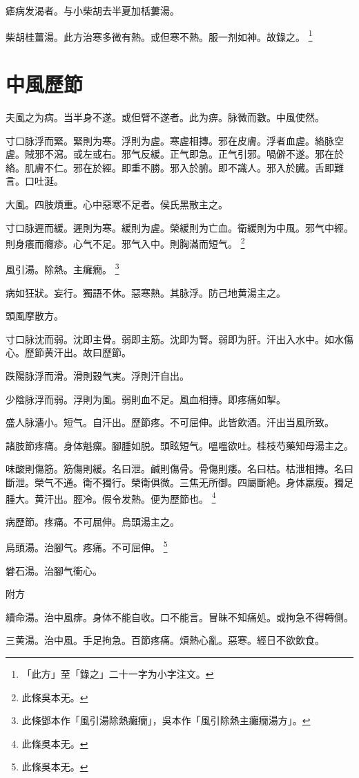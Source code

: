 \documentclass[12pt,twoside,UTF8,b5paper]{ctexbook}
\begin{document}
瘧病发渴者。与小柴胡去半夏加栝蔞湯。

柴胡桂薑湯。此方治寒多微有熱。或但寒不熱。服一剂如神。故錄之。
	\footnote{「此方」至「錄之」二十一字为小字注文。}

\chapter{中風歷節}

夫風之为病。当半身不遂。或但臂不遂者。此为痹。脉微而數。中風使然。

寸口脉浮而緊。緊則为寒。浮則为虗。寒虗相摶。邪在皮膚。浮者血虗。絡脉空虗。賊邪不瀉。或左或右。邪气反緩。正气即急。正气引邪。喎僻不遂。邪在於絡。肌膚不仁。邪在於經。即重不勝。邪入於腑。即不識人。邪入於臓。舌即難言。口吐涎。

大風。四肢煩重。心中惡寒不足者。侯氏黑散主之。

寸口脉遲而緩。遲則为寒。緩則为虗。榮緩則为亡血。衛緩則为中風。邪气中經。則身癢而癮疹。心气不足。邪气入中。則胸滿而短气。
	\footnote{此條吳本无。}

風引湯。除熱。主癱癇。
	\footnote{此條鄧本作「風引湯除熱癱癇」，吳本作「風引除熱主癱癇湯方」。}

病如狂狀。妄行。獨語不休。惡寒熱。其脉浮。防己地黄湯主之。

頭風摩散方。

寸口脉沈而弱。沈即主骨。弱即主筋。沈即为腎。弱即为肝。汗出入水中。如水傷心。歷節黄汗出。故曰歷節。

跌陽脉浮而滑。滑則穀气実。浮則汗自出。

少陰脉浮而弱。浮則为風。弱則血不足。風血相摶。即疼痛如掣。

盛人脉濇小。短气。自汗出。歷節疼。不可屈伸。此皆飲酒。汗出当風所致。

諸肢節疼痛。身体魁瘰。腳腫如脱。頭眩短气。嗢嗢欲吐。桂枝芍藥知母湯主之。

味酸則傷筋。筋傷則緩。名曰泄。鹹則傷骨。骨傷則痿。名曰枯。枯泄相摶。名曰斷泄。榮气不通。衛不獨行。榮衛俱微。三焦无所御。四屬斷絶。身体羸瘦。獨足腫大。黄汗出。脛冷。假令发熱。便为歷節也。
	\footnote{此條吳本无。}

病歷節。疼痛。不可屈伸。烏頭湯主之。

烏頭湯。治腳气。疼痛。不可屈伸。
	\footnote{此條吳本无。}

礬石湯。治腳气衝心。

附方

續命湯。治中風痱。身体不能自收。口不能言。冒昧不知痛処。或拘急不得轉側。

三黄湯。治中風。手足拘急。百節疼痛。煩熱心亂。惡寒。經日不欲飲食。
\end{document}

